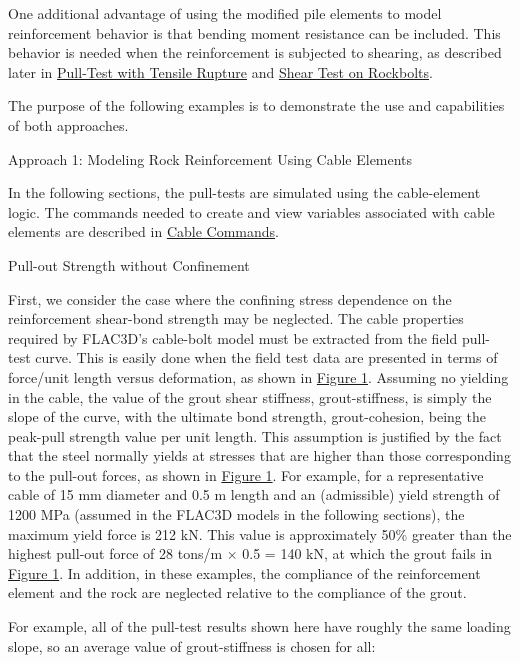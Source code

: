 \documentclass[a4paper, nobind]{templates/ociamthesis}
\begin{document}
One additional advantage of using the modified pile elements to model
reinforcement behavior is that bending moment resistance can be
included. This
behavior is needed when the reinforcement is subjected to shearing, as
described
later in \protect\hyperlink{pulltest-tensile-rupture-section}{Pull-Test with Tensile
Rupture} and \protect\hyperlink{pulltest-shear-bolt-section}{Shear Test on
Rockbolts}.

The purpose of the following examples is to demonstrate the use and
capabilities of both approaches.

Approach 1: Modeling Rock Reinforcement Using Cable
Elements

In the following sections, the pull-tests are simulated using the
cable-element logic. The commands needed to create and view variables
associated
with cable elements are described in \href{../../../../sel/doc/manual/sel_manual/cables/commands/cable_commands.html\#sel-cable-commands}{Cable
Commands}.

Pull-out Strength without
Confinement

First, we consider the case where the confining stress dependence on the
reinforcement shear-bond strength may be neglected. The cable properties
required by FLAC3D's cable-bolt model must be
extracted from the field pull-test curve. This is easily done when the
field
test data are presented in terms of force/unit length versus
deformation, as
shown in \protect\hyperlink{pulltest-fieldresults}{Figure 1}. Assuming no yielding in
the cable, the value of the grout shear stiffness, grout-stiffness, is
simply the slope of the curve, with the
ultimate bond strength, grout-cohesion, being the
peak-pull strength value per unit length. This assumption is justified
by the
fact that the steel normally yields at stresses that are higher than
those
corresponding to the pull-out forces, as shown in \protect\hyperlink{pulltest-fieldresults}{Figure
1}. For example, for a representative
cable of 15 mm diameter and 0.5 m length and an (admissible) yield
strength of
1200 MPa (assumed in the FLAC3D models in the
following sections), the maximum yield force is 212 kN. This value is
approximately 50\% greater than the highest pull-out force of 28 tons/m ×
0.5 =
140 kN, at which the grout fails in \protect\hyperlink{pulltest-fieldresults}{Figure
1}. In addition, in these examples, the
compliance of the reinforcement
element and the rock are neglected relative to the compliance of the
grout.

For example, all of the pull-test results shown here have roughly the
same
loading slope, so an average value of grout-stiffness
is chosen for all:
\end{document}
